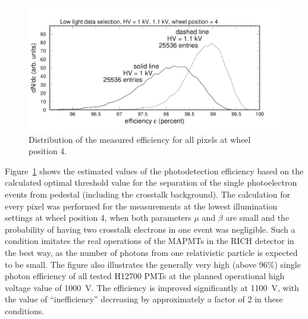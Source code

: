 \begin{figure}[h!]
	\centering
	\includegraphics[width=0.98\linewidth, trim=0 12 50 35, clip]{figures/pglobal_eff.pdf}
	\caption{Distribution of the measured efficiency for all pixels at wheel position 4.}
	\label{fig:pglobal_eff}
\end{figure}
Figure~\ref{fig:pglobal_eff} shows the estimated values of the photodetection efficiency based on the calculated optimal threshold value for the separation of the single photoelectron events from pedestal (including the crosstalk background). The calculation for every pixel was performed for the measurements at the lowest illumination settings at wheel position 4, when both parameters $\mu$ and $\beta$ are small and the probability of having two crosstalk electrons in one event was negligible. Such a condition imitates the real operations of the MAPMTs in the RICH detector in the best way, as the number of photons from one relativistic particle is expected to be small. The figure also illustrates the generally very high (above 96\%) single photon efficiency of all tested H12700 PMTs at the planned operational high voltage value of 1000~V. The efficiency is improved significantly at 1100~V, with the value of ``inefficiency'' decreasing by approximately a factor of 2 in these conditions.

